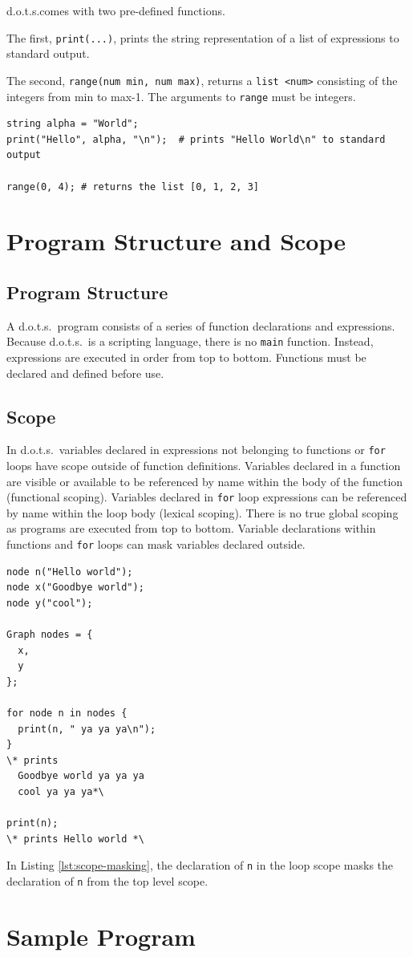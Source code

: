 \documentclass{article}
\newcommand{\pltlang}{d.o.t.s.} %
\newcommand{\code}[1]{\texttt{#1}} %
\begin{document}
\pltlang comes with two pre-defined functions. 

The first, \code{print(...)}, prints the string representation of a list of expressions to standard output.

The second, \code{range(num min, num max)}, returns a \code{list <num>} consisting of the integers from min to max-1. The arguments to \code{range} must be integers.

\begin{lstlisting}[language=pltLang, caption=The built-in ``print'' function., label=lst:builtin-functs]
string alpha = "World";
print("Hello", alpha, "\n");  # prints "Hello World\n" to standard output

range(0, 4); # returns the list [0, 1, 2, 3]
\end{lstlisting}

\section{Program Structure and Scope}

\subsection{Program Structure}

A \pltlang\ program consists of a series of function declarations and expressions. Because \pltlang\ is a scripting language, there is no \code{main} function. Instead, expressions are executed in order from top to bottom. Functions must be declared and defined before use. 

\subsection{Scope}

In \pltlang\, variables declared in expressions not belonging to functions or \code{for} loops have scope outside of function definitions. Variables declared in a function are visible or available to be referenced by name within the body of the function (functional scoping). Variables declared in \code{for} loop expressions can be referenced by name within the loop body (lexical scoping). There is no true global scoping as programs are executed from top to bottom. Variable declarations within functions and \code{for} loops can mask variables declared outside.

\begin{lstlisting}[language=pltLang, caption=Example of masking, label=lst:scope-masking]
node n("Hello world");
node x("Goodbye world");
node y("cool");

Graph nodes = {
  x,
  y
};

for node n in nodes {
  print(n, " ya ya ya\n");
}
\* prints
  Goodbye world ya ya ya
  cool ya ya ya*\

print(n);
\* prints Hello world *\
\end{lstlisting}

In Listing \ref{lst:scope-masking}, the declaration of \code{n} in the loop scope masks the declaration of \code{n} from the top level scope.

\section{Sample Program}
\end{document}
